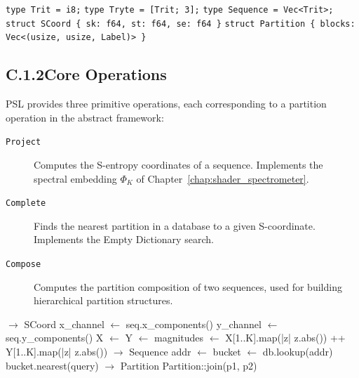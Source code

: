\vspace{4pt}
\begin{algorithm}
\caption{PSL Type Declarations (Rust-like syntax)}
\label{alg:psl_types}
\begin{algorithmic}[1]
\State \texttt{type Trit = i8;} 
\State \texttt{type Tryte = [Trit; 3];} 
\State \texttt{type Sequence = Vec<Trit>;}
\State \texttt{struct SCoord \{ sk: f64, st: f64, se: f64 \}}
\State \texttt{struct Partition \{ blocks: Vec<(usize, usize, Label)> \}}
\end{algorithmic}
\end{algorithm}

\subsection*{C.1.2\quad Core Operations}

PSL provides three primitive operations, each corresponding to a partition
operation in the abstract framework:

\begin{description}
  \item[\texttt{Project}] Computes the S-entropy coordinates of a sequence.
        Implements the spectral embedding $\Phi_K$ of Chapter~\ref{chap:shader_spectrometer}.
  \item[\texttt{Complete}] Finds the nearest partition in a database to a
        given S-coordinate. Implements the Empty Dictionary search.
  \item[\texttt{Compose}] Computes the partition composition of two sequences,
        used for building hierarchical partition structures.
\end{description}

\begin{algorithm}
\caption{PSL Core Operations (sketch)}
\label{alg:psl_ops}
\begin{algorithmic}[1]
 $\to$ SCoord
  \State x\_channel $\gets$ seq.x\_components()
  \State y\_channel $\gets$ seq.y\_components()
  \State X $\gets$ 
  \State Y $\gets$ 
  \State magnitudes $\gets$ X[1..K].map(|z| z.abs()) ++ Y[1..K].map(|z| z.abs())
  \State \Return {}
\EndFunction
\State
{} $\to$ Sequence
  \State addr $\gets$ 
  \State bucket $\gets$ db.lookup(addr) 
  \State \Return bucket.nearest(query) 
\EndFunction
\State
{} $\to$ Partition
  \State \Return Partition::join(p1, p2) 
\EndFunction
\end{algorithmic}
\end{algorithm}

